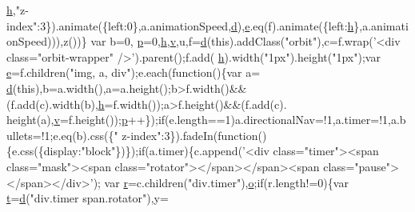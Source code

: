 \begin{DoxyCode}
      \hyperlink{data_tables_8scroller_8min_8js_a7ddc97992591bc8a855e841ba3ee5d32}{h},\textcolor{stringliteral}{"z-index"}:3\}).animate(\{left:0\},a.animationSpeed,\hyperlink{jquery_8orbit-1_82_83_8min_8js_a36541169dfff685f807208881a4f0021}{d}),\hyperlink{_auto_fill_8min_8js_a2c038346d47955cbe2cb91e338edd7e1}{e}.eq(f).animate(\{left:\hyperlink{data_tables_8scroller_8min_8js_a7ddc97992591bc8a855e841ba3ee5d32}{h}\},a.animationSpeed))),z())\}
      var b=0,
\hyperlink{media_2js_2jquery_8js_a32d2366ed9853870f0c2ef3553996e29}{p}=0,\hyperlink{data_tables_8scroller_8min_8js_a7ddc97992591bc8a855e841ba3ee5d32}{h},\hyperlink{jquery_8fancybox_8pack_8js_a207400f40ed647015069564fa40946e1}{v},u,f=\hyperlink{jquery_8orbit-1_82_83_8min_8js_a36541169dfff685f807208881a4f0021}{d}(\textcolor{keyword}{this}).addClass(\textcolor{stringliteral}{"orbit"}),c=f.wrap(\textcolor{stringliteral}{'<div class="orbit-wrapper" />'}).parent();f.add(
      \hyperlink{data_tables_8scroller_8min_8js_a7ddc97992591bc8a855e841ba3ee5d32}{h}).width(\textcolor{stringliteral}{"1px"}).height(\textcolor{stringliteral}{"1px"});var \hyperlink{_auto_fill_8min_8js_a2c038346d47955cbe2cb91e338edd7e1}{e}=f.children(\textcolor{stringliteral}{"img, a, div"});e.each(\textcolor{keyword}{function}()\{var a=
      \hyperlink{jquery_8orbit-1_82_83_8min_8js_a36541169dfff685f807208881a4f0021}{d}(\textcolor{keyword}{this}),b=a.width(),a=a.height();b>f.width()&&(f.add(c).width(b),\hyperlink{data_tables_8scroller_8min_8js_a7ddc97992591bc8a855e841ba3ee5d32}{h}=f.width());a>f.height()&&(f.add(c).
      height(a),\hyperlink{jquery_8fancybox_8pack_8js_a207400f40ed647015069564fa40946e1}{v}=f.height());\hyperlink{media_2js_2jquery_8js_a32d2366ed9853870f0c2ef3553996e29}{p}++\});\textcolor{keywordflow}{if}(e.length==1)a.directionalNav=!1,a.timer=!1,a.bullets=!1;e.eq(b).css(\{\textcolor{stringliteral}{"
      z-index"}:3\}).fadeIn(\textcolor{keyword}{function}()\{e.css(\{display:\textcolor{stringliteral}{"block"}\})\});\textcolor{keywordflow}{if}(a.timer)\{c.append(\textcolor{stringliteral}{'<div class="timer"><span
       class="mask"><span class="rotator"></span></span><span class="pause"></span></div>'});
var \hyperlink{prism_8js_a514f1b439f404f86f77090fa9edc96ce}{r}=c.children(\textcolor{stringliteral}{"div.timer"}),\hyperlink{_col_reorder_8min_8js_a73cc426a4c4f73fa4748aee3ef8ef98d}{o};\textcolor{keywordflow}{if}(r.length!=0)\{var \hyperlink{jquery_8knob_8js_aa09e7cf223942a40813c00a3897b7c48}{t}=\hyperlink{jquery_8orbit-1_82_83_8min_8js_a36541169dfff685f807208881a4f0021}{d}(\textcolor{stringliteral}{"div.timer span.rotator"}),y=

\end{DoxyCode}
